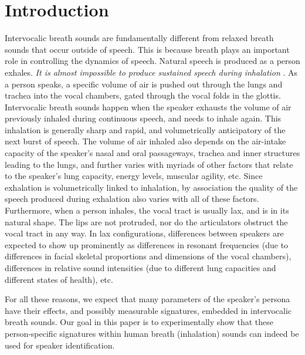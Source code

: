 \documentclass[a4paper]{article}
\begin{document}
\section{Introduction}
Intervocalic breath sounds are fundamentally different from relaxed breath sounds that occur outside of speech. This is because breath plays an important role in controlling the dynamics of speech. Natural speech is produced as a person exhales. \textit{It is almost impossible to produce sustained speech during inhalation}  \cite{warren1976aerodynamics}. As a person speaks, a specific volume of air is pushed out through the lungs and trachea into the vocal chambers, gated through the vocal folds in the glottis.
Intervocalic breath sounds happen when the speaker exhausts the volume of air previously inhaled during continuous speech, and needs to inhale again.
This inhalation is generally sharp and rapid, and volumetrically anticipatory of the next burst of speech. The volume of air inhaled also depends on the air-intake capacity of the speaker's nasal and oral passageways, trachea and inner structures leading to the lungs, and further varies with myriads of other factors that relate to the speaker's lung capacity, energy levels, muscular agility, etc. Since exhalation is volumetrically linked to inhalation, by association the quality of the speech produced during exhalation also varies with all of these factors. Furthermore, when a person inhales, the vocal tract is usually lax, and is in its natural shape. The lips are not protruded, nor do the articulators obstruct the vocal tract in any way. In lax configurations, differences between speakers are expected to show up prominently as differences in resonant frequencies (due to differences in facial skeletal proportions and dimensions of the vocal chambers), differences in relative sound intensities (due to different lung capacities and different states of health), etc.

For all these reasons, we expect that many parameters of the speaker's persona have their effects, and possibly measurable signatures, embedded in intervocalic breath sounds. Our goal in this paper is to experimentally show that these person-specific signatures within human breath (inhalation) sounds can indeed be used for speaker identification.
\end{document}
